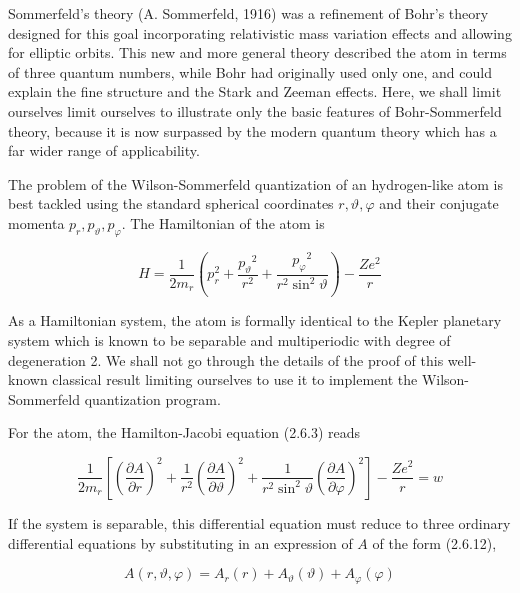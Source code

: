 \documentclass{article}
\begin{document}
Sommerfeld's theory (A. Sommerfeld, 1916) was a refinement of Bohr's theory designed for this goal incorporating relativistic mass variation effects and allowing for elliptic orbits. This new and more general theory described the atom in terms of three quantum numbers, while Bohr had originally used only one, and could explain the fine structure and the Stark and Zeeman effects. Here, we shall limit
ourselves limit ourselves to illustrate only the basic features of Bohr-Sommerfeld theory, because it is now surpassed by the modern quantum theory which has a far wider range of applicability.

The problem of the Wilson-Sommerfeld quantization of an hydrogen-like atom is best tackled using the standard spherical coordinates $r, \vartheta, \varphi$ and their conjugate momenta $p_{r}, p_{\vartheta}, p_{\varphi}$. The Hamiltonian of the atom is
 
\begin{equation*}
H=\frac{1}{2 m_{r}}\left(p_{r}^{2}+\frac{p_{\vartheta}{ }^{2}}{r^{2}}+\frac{p_{\varphi}{ }^{2}}{r^{2} \sin ^{2} \vartheta}\right)-\frac{Z e^{2}}{r} \tag{2.8.1}
\end{equation*}
 

As a Hamiltonian system, the atom is formally identical to the Kepler planetary system which is known to be separable and multiperiodic with degree of degeneration 2. We shall not go through the details of the proof of this well-known classical result limiting ourselves to use it to implement the Wilson-Sommerfeld quantization program.

For the atom, the Hamilton-Jacobi equation (2.6.3) reads
 
\begin{equation*}
\frac{1}{2 m_{r}}\left[\left(\frac{\partial A}{\partial r}\right)^{2}+\frac{1}{r^{2}}\left(\frac{\partial A}{\partial \vartheta}\right)^{2}+\frac{1}{r^{2} \sin ^{2} \vartheta}\left(\frac{\partial A}{\partial \varphi}\right)^{2}\right]-\frac{Z e^{2}}{r}=w \tag{2.8.2}
\end{equation*}
 

If the system is separable, this differential equation must reduce to three ordinary differential equations by substituting in an expression of $A$ of the form (2.6.12),
 
\begin{equation*}
A(r, \vartheta, \varphi)=A_{r}(r)+A_{\vartheta}(\vartheta)+A_{\varphi}(\varphi) \tag{2.8.3}
\end{equation*}
 
\end{document}
